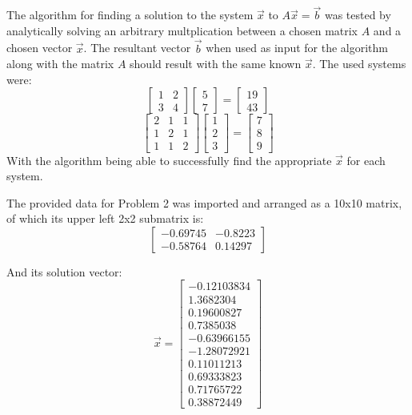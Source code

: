\documentclass[twocolumn]{article}
\begin{document}
The algorithm for finding a solution to the system $\vec{x}$ to $A\vec{x} = \vec{b}$ was tested by analytically solving an arbitrary multplication between
a chosen matrix $A$ and a chosen vector $\vec{x}$. The resultant vector $\vec{b}$ when used as input for the algorithm along with the matrix $A$
should result with the same known $\vec{x}$. The used systems were:
\[\begin{bmatrix}
  1 & 2 \\
  3 & 4
 \end{bmatrix}
 \begin{bmatrix}
  5 \\
  7
 \end{bmatrix}
 =
 \begin{bmatrix}
  19 \\
  43
 \end{bmatrix}\]
\[\begin{bmatrix}
  2 & 1 & 1 \\
  1 & 2 & 1 \\
  1 & 1 & 2
 \end{bmatrix}
 \begin{bmatrix}
  1 \\
  2 \\
  3
 \end{bmatrix}
 =
 \begin{bmatrix}
  7 \\
  8 \\
  9
 \end{bmatrix}\]
With the algorithm being able to successfully find the appropriate $\vec{x}$ for each system.

The provided data for Problem 2 was imported and arranged as a 10x10 matrix, of which its upper left 2x2 submatrix is:
\[\begin{bmatrix}
 -0.69745 & -0.8223 \\
 -0.58764 & 0.14297
\end{bmatrix}\]

And its solution vector:
\[\vec{x} = 
 \begin{bmatrix}
  -0.12103834 \\
  1.3682304 \\ 
  0.19600827 \\ 
  0.7385038 \\ 
  -0.63966155 \\
  -1.28072921 \\ 
  0.11011213 \\ 
  0.69333823 \\ 
  0.71765722 \\
  0.38872449
 \end{bmatrix}\]
\end{document}
